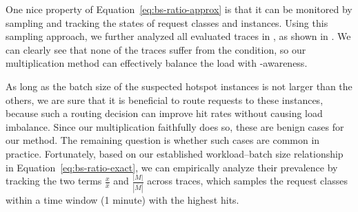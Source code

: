 One nice property of Equation~\ref{eq:bs-ratio-approx} is that it
can be monitored by sampling and tracking the states of request classes
and instances.
Using this sampling approach, we further analyzed all evaluated traces in \textsection{\ref{sec:eval-setup}},
as shown in .
We can clearly see that none of the traces suffer from the condition,
so our multiplication method can effectively balance the load with {\kvcache}-awareness.
\fi

As long as the batch size of the suspected hotspot instances is not larger than the others,
we are sure that it is beneficial to route requests to these instances,
because such a routing decision can improve {\kvcache} hit rates without causing load imbalance.
Since our multiplication faithfully does so,
these are benign cases for our method.
The remaining question is whether such cases are common in practice. 
Fortunately, based on our established workload--batch size relationship in Equation~\ref{eq:bs-ratio-exact}, 
we can empirically analyze their prevalence by tracking the two terms
\(\frac{x}{\bar{x}}\) and \(\frac{|M|}{|\overline{M}|}\) across traces,
which samples the request classes within a time window (1 minute) with the highest {\kvcache} hits. 

